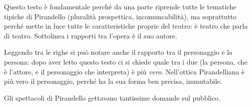 Questo testo è fondamentale perché da una parte riprende tutte le tematiche tipiche di Pirandello (pluralità prospettica, incomuncabilità), ma soprattutto perché mette in luce tutte le caratteristiche proprie del teatro: è teatro che parla di teatro. Sottolinea i rapporti tra l’opera è il suo autore.

Leggendo tra le righe si può notare anche il rapporto tra il personaggio e la persona: dopo aver letto questo testo ci si chiede quale tra i due (la persona, che è l’attore, e il personaggio che interpreta) è più \textit{vero}.
Nell’ottica Pirandelliana è più vero il personaggio, perché ha la sua forma ben precisa, immutabile.

Gli spettacoli di Pirandello gettavano tantissime domande sul pubblico.